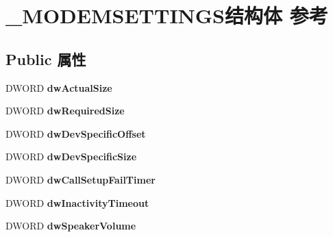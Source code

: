 \hypertarget{struct___m_o_d_e_m_s_e_t_t_i_n_g_s}{}\section{\+\_\+\+M\+O\+D\+E\+M\+S\+E\+T\+T\+I\+N\+G\+S结构体 参考}
\label{struct___m_o_d_e_m_s_e_t_t_i_n_g_s}
\subsection*{Public 属性}
\begin{DoxyCompactItemize}
\item 
\mbox{\label{struct___m_o_d_e_m_s_e_t_t_i_n_g_s_aa72c84820dd44f96319c7621c5af54b0}} 
D\+W\+O\+RD {\bfseries dw\+Actual\+Size}
\item 
\mbox{\label{struct___m_o_d_e_m_s_e_t_t_i_n_g_s_a3aa27440d6d17e6b61da0c848055911f}} 
D\+W\+O\+RD {\bfseries dw\+Required\+Size}
\item 
\mbox{\label{struct___m_o_d_e_m_s_e_t_t_i_n_g_s_aa0dee5e15a9949003cc0eb0909067180}} 
D\+W\+O\+RD {\bfseries dw\+Dev\+Specific\+Offset}
\item 
\mbox{\label{struct___m_o_d_e_m_s_e_t_t_i_n_g_s_a887c0e8c618a69e431bcb1c594d1df22}} 
D\+W\+O\+RD {\bfseries dw\+Dev\+Specific\+Size}
\item 
\mbox{\label{struct___m_o_d_e_m_s_e_t_t_i_n_g_s_a97d725fdf1a1d132effa57b59a4a4aa8}} 
D\+W\+O\+RD {\bfseries dw\+Call\+Setup\+Fail\+Timer}
\item 
\mbox{\label{struct___m_o_d_e_m_s_e_t_t_i_n_g_s_a02fe39507a3b9e5186206f1bf39549ff}} 
D\+W\+O\+RD {\bfseries dw\+Inactivity\+Timeout}
\item 
\mbox{\label{struct___m_o_d_e_m_s_e_t_t_i_n_g_s_a53ae9c276f5499f1f1fea542c1f7a786}} 
D\+W\+O\+RD {\bfseries dw\+Speaker\+Volume}
\item 
\mbox{\label{struct___m_o_d_e_m_s_e_t_t_i_n_g_s_ae72e95ddc782d239cd62196640e7fa58}} 

\end{DoxyCompactItemize}
